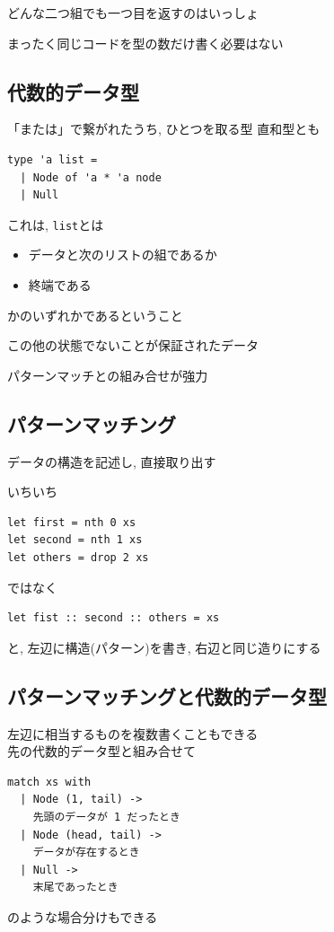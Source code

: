 \documentclass[papersize,30pt,slide]{jsarticle}
\begin{document}
\vspace{1em}

どんな二つ組でも一つ目を返すのはいっしょ


\vspace{1em}

まったく同じコードを型の数だけ書く必要はない

\newpage

\subsection{代数的データ型}
「または」で繋がれたうち, ひとつを取る型 直和型とも

\begin{lstlisting}
type 'a list =
  | Node of 'a * 'a node
  | Null
\end{lstlisting}
これは, \lstinline|list|とは
\begin{itemize}
\item データと次のリストの組であるか
\item 終端である
\end{itemize}
かのいずれかであるということ

この他の状態でないことが保証されたデータ

パターンマッチとの組み合せが強力


\newpage
\subsection{パターンマッチング}
データの構造を記述し, 直接取り出す

いちいち
\begin{lstlisting}
let first = nth 0 xs
let second = nth 1 xs
let others = drop 2 xs
\end{lstlisting}
ではなく
\begin{lstlisting}
let fist :: second :: others = xs
\end{lstlisting}
と, 左辺に構造(パターン)を書き, 右辺と同じ造りにする

\newpage
\subsection{パターンマッチングと代数的データ型}
左辺に相当するものを複数書くこともできる \\
先の代数的データ型と組み合せて
\begin{lstlisting}
match xs with
  | Node (1, tail) ->
    先頭のデータが 1 だったとき
  | Node (head, tail) ->
    データが存在するとき
  | Null ->
    末尾であったとき
\end{lstlisting}
のような場合分けもできる
\end{document}
